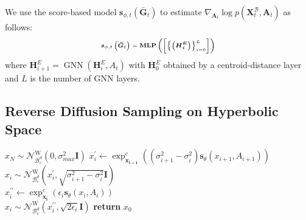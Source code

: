 \documentclass[letterpaper]{article} %
\begin{document}
We use the score-based model $\boldsymbol{s}_{\phi, t}(\boldsymbol{\bar{G}}_{t}) $ to estimate $\nabla_{\boldsymbol{A}_{t}} \log p\left(\boldsymbol{X}^\mathcal{B}_{t},\boldsymbol{A}_{t} \right)$ as follows:
\begin{equation}
\begin{scriptsize}
\boldsymbol{s}_{\phi, t}\left(\boldsymbol{\bar{G}}_{t}\right)=\operatorname{\textbf{MLP}}
\left(\left[\left\{\left(\boldsymbol{\boldsymbol{H}^E_{i}}\right)\right\}_{i=0}^{L}\right]\right)
\end{scriptsize}
\end{equation}
where $\boldsymbol{H}^E_{i+1} = \operatorname{\mathrm{GNN}}(\boldsymbol{H}^E_i,A_t)$ with $\boldsymbol{H}^E_0$ obtained by a centroid-distance layer and $L$ is the number of GNN layers.
\subsection{Reverse Diffusion Sampling on Hyperbolic Space}
\begin{algorithm}[t]
\caption{Hyperbolic PC sampling (VE SDE)}
\label{alg:algorithm1}
\begin{algorithmic}[1] %
\STATE $x_N\sim \mathcal{N}_{\mathcal{B}_{c}^{d}}^{\mathrm{W}}(0,\sigma^2_{max} \mathbf{I})$
    \STATE $x^\prime_i \gets \exp _{\boldsymbol{x_{i+1}}}^{c}((\sigma^2_{i+1}-\sigma^2_i)\boldsymbol{s}_\theta(x_{i+1},A_{i+1}))$\\
    \STATE $x_i\sim \mathcal{N}_{\mathcal{B}_{c}^{d}}^{\mathrm{W}}(x^\prime_i,\sqrt{\sigma^2_{i+1}-\sigma^2_i} \mathbf{I})$\\
        \STATE $x^{\prime\prime}_i \gets  \exp _{\boldsymbol{x_{i}}}^{c}(\epsilon_i\boldsymbol{s}_\theta(x_{i},A_{i}))$ \\
        \STATE $x_i \sim \mathcal{N}_{\mathcal{B}_{c}^{d}}^{\mathrm{W}}(x^{\prime\prime}_i,\sqrt{2\epsilon_i} \mathbf{I}) $
    \ENDFOR
\ENDFOR
\STATE \textbf{return} $x_0$
\end{algorithmic}
\end{algorithm}
\end{document}
